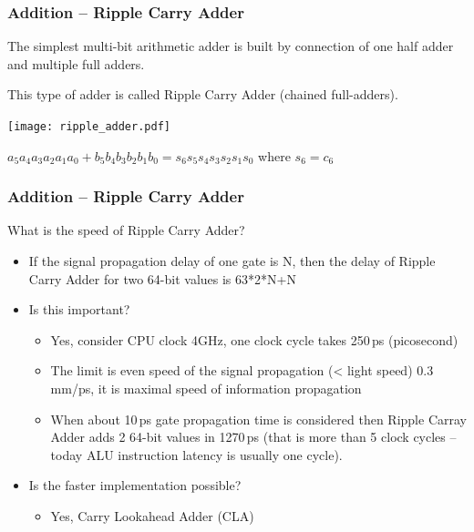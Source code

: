 \documentclass{beamer}
\begin{document}
\begin{frame}
\frametitle{Addition -- Ripple Carry Adder}

The simplest multi-bit arithmetic adder is built by connection of one half adder and multiple full adders.

This type of adder is called Ripple Carry Adder (chained full-adders).

\begin{center}
   \texttt{[image: ripple\_adder.pdf]}
\end{center}

$a_5a_4a_3a_2a_1a_0 + b_5b_4b_3b_2b_1b_0 = s_6s_5s_4s_3s_2s_1s_0$ where $s_6 = c_6$

\end{frame}

\begin{frame}
\frametitle{Addition -- Ripple Carry Adder}

What is the speed of Ripple Carry Adder?
\begin{itemize}
\item If the signal propagation delay of one gate is N, then the delay of Ripple Carry Adder for two 64-bit values is 63*2*N+N
\item Is this important?
\begin{itemize}
\item Yes, consider CPU clock 4GHz, one clock cycle takes 250\,ps (picosecond)
\item The limit is even speed of the signal propagation (< light speed) 0.3\,mm/ps, it is maximal speed of information propagation
\item When about 10\,ps gate propagation time is considered then Ripple Carray Adder adds 2 64-bit values in 1270\,ps (that is more than 5 clock cycles -- today ALU instruction latency is usually one cycle).
\end{itemize}
\item Is the faster implementation possible?
\begin{itemize}
\item Yes, Carry Lookahead Adder (CLA)
\end{itemize}
\end{itemize}

\end{frame}
\end{document}
